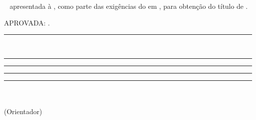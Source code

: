 \newpage
 \thispagestyle{empty}
 \setcounter{page}{1}
\begin{spacing}{1}
\begin{center}
{\MakeUppercase{\nome} \\ }

\vspace*{4.2cm}
{\MakeUppercase{\textbf{\titulo}} \\ }
\end{center}

\vspace*{2.6cm}
\singlespacing
\begin{flushright}
\begin{minipage}{7.5cm}
{\tipo~ apresentada à \instituicao, como parte
  das exigências do \curso em \programa, para
  obtenção do título de \textit{\titulop}.}
\end{minipage}
\end{flushright}
\vspace*{1.3cm}
%
%
APROVADA: \aprovacao.
\vfill
%
%
\begin{minipage}{0.45\linewidth}
\centering
\vspace{0.5cm}
\rule{\linewidth}{0.1mm}\\
{\membroa}%
\end{minipage}
\hfill
\begin{minipage}{0.45\linewidth}
\centering
\vspace*{0.5cm}
\rule{\linewidth}{0.1mm}
{\membrob}%
\end{minipage}
\vfill
\begin{minipage}{0.45\linewidth}
\centering
\rule{\linewidth}{0.1mm}
{\membroc}%
\end{minipage}
\hfill
\begin{minipage}{0.45\linewidth}
\centering
\rule{\linewidth}{0.1mm}
{\membrod}%
\end{minipage}

\vfill
\begin{center}
\begin{minipage}{7.5cm}
{\begin{center}
\rule{\linewidth}{0.1mm} \\
{\membroe}\\%
(Orientador)
\end{center}}
\end{minipage}
\end{center}
\end{spacing}
